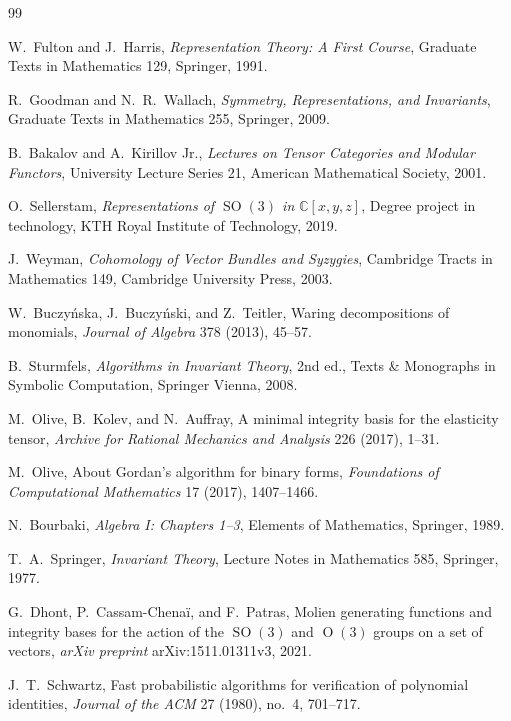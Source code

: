 \documentclass[11pt]{article}
\newcommand{\dsC}{\mathbb{C}}
\newcommand{\SO}{\operatorname{SO}}
\theoremstyle{definition}
\begin{document}
\begin{thebibliography}{99}

  W.~Fulton and J.~Harris,
  \emph{Representation Theory: A First Course},
  Graduate Texts in Mathematics 129,
  Springer, 1991.

  R.~Goodman and N.~R.~Wallach,
  \emph{Symmetry, Representations, and Invariants},
  Graduate Texts in Mathematics 255,
  Springer, 2009.

  B.~Bakalov and A.~Kirillov Jr.,
  \emph{Lectures on Tensor Categories and Modular Functors},
  University Lecture Series 21,
  American Mathematical Society, 2001.

  O.~Sellerstam,
  \emph{Representations of $\SO(3)$ in $\dsC[x,y,z]$},
  Degree project in technology, KTH Royal Institute of Technology, 2019.

  J.~Weyman,
  \emph{Cohomology of Vector Bundles and Syzygies},
  Cambridge Tracts in Mathematics 149,
  Cambridge University Press, 2003.

  W.~Buczy\'nska, J.~Buczy\'nski, and Z.~Teitler,
  Waring decompositions of monomials,
  \emph{Journal of Algebra} 378 (2013), 45--57.

  B.~Sturmfels,
  \emph{Algorithms in Invariant Theory},
  2nd ed.,
  Texts \& Monographs in Symbolic Computation,
  Springer Vienna, 2008.

  M.~Olive, B.~Kolev, and N.~Auffray,
  A minimal integrity basis for the elasticity tensor,
  \emph{Archive for Rational Mechanics and Analysis} 226 (2017), 1--31.

  M.~Olive,
  About Gordan's algorithm for binary forms,
  \emph{Foundations of Computational Mathematics} 17 (2017), 1407--1466.

  N.~Bourbaki,
  \emph{Algebra I: Chapters 1--3},
  Elements of Mathematics,
  Springer, 1989.

  T.~A.~Springer,
  \emph{Invariant Theory},
  Lecture Notes in Mathematics 585,
  Springer, 1977.

  G.~Dhont, P.~Cassam-Chena\"i, and F.~Patras,
  Molien generating functions and integrity bases for the action of the $\SO(3)$ and $\operatorname{O}(3)$ groups on a set of vectors,
  \emph{arXiv preprint} arXiv:1511.01311v3, 2021.

  J.~T.~Schwartz,
  Fast probabilistic algorithms for verification of polynomial identities,
  \emph{Journal of the ACM} 27 (1980), no.~4, 701--717.


\end{thebibliography}
\end{document}
